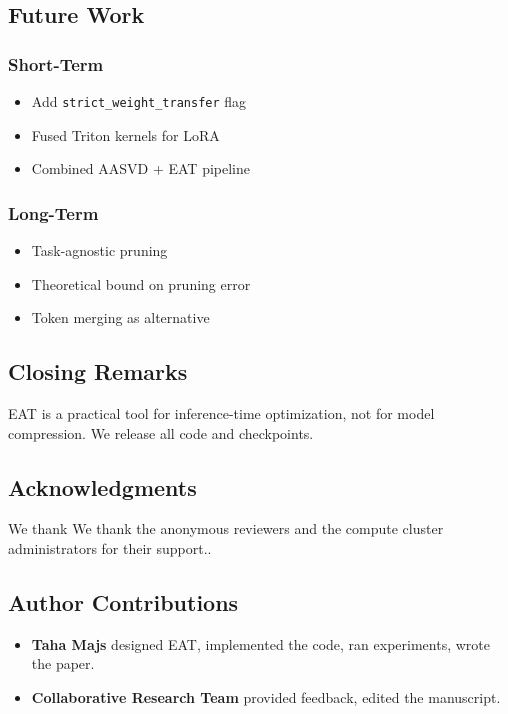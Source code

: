 \subsection{Future Work}

\subsubsection{Short-Term}
\begin{itemize}
\item Add \texttt{strict\_weight\_transfer} flag
\item Fused Triton kernels for LoRA
\item Combined AASVD + EAT pipeline

\end{itemize}
\subsubsection{Long-Term}
\begin{itemize}
\item Task-agnostic pruning
\item Theoretical bound on pruning error
\item Token merging as alternative

\end{itemize}
\subsection{Closing Remarks}

EAT is a practical tool for inference-time optimization, not for model 
compression. We release all code and checkpoints.

\subsection{Acknowledgments}

We thank We thank the anonymous reviewers and the compute cluster administrators for their support..

\subsection{Author Contributions}

\begin{itemize}
\item \textbf{Taha Majs} designed EAT, implemented the code, ran experiments,
  wrote the paper.
\item \textbf{Collaborative Research Team} provided feedback, edited the manuscript.

\end{itemize}
